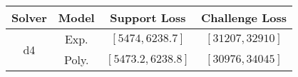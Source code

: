 \begin{tabular}{cc|c|c} 
\hline 
 Solver & Model & Support Loss  & Challenge Loss \tabularnewline\hline 
\hline 
\multirow{2}{*}{d4} & Exp. & $\left[5474,6238.7\right]$ & $\left[31207,32910\right]$ \tabularnewline 
 & Poly. & $\left[5473.2,6238.8\right]$ & $\left[30976,34045\right]$ \tabularnewline 
\hline 
\end{tabular} 

